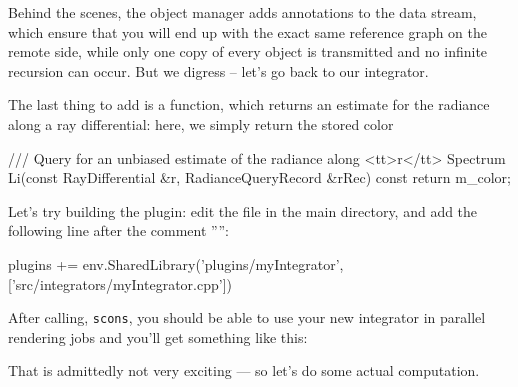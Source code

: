 Behind the scenes, the object manager adds annotations to the data stream,
which ensure that you will end up with the exact same reference graph on the
remote side, while only one copy of every object is transmitted and no 
infinite recursion can occur. But we digress -- let's go back to our integrator.
\vspace{3mm}

The last thing to add is a function, which returns an estimate for the
radiance along a ray differential: here, we simply return the stored color
\begin{cpp}
    /// Query for an unbiased estimate of the radiance along <tt>r</tt>
   Spectrum Li(const RayDifferential &r, RadianceQueryRecord &rRec) const {
       return m_color;
   }
\end{cpp}

Let's try building the plugin: edit the  file in the main
directory, and add the following line after the comment '''':
\begin{cpp}
plugins += env.SharedLibrary('plugins/myIntegrator', ['src/integrators/myIntegrator.cpp'])
\end{cpp}
After calling, \texttt{scons}, you should be able to use your new integrator
in parallel rendering jobs and you'll get something like this:
\begin{center}
\end{center}
That is admittedly not very exciting --- so let's do some actual computation.
